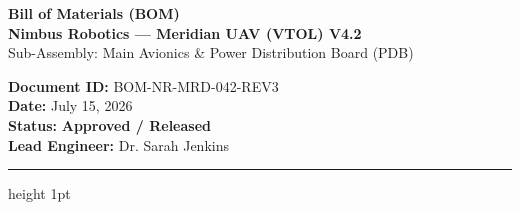 \documentclass[10pt,letterpaper]{article}
\begin{document}

\noindent
\begin{minipage}[t]{0.6\textwidth}
  {\Huge\bfseries\color{primaryColor} Bill of Materials (BOM)} \\[4pt]
  {\large\bfseries\color{secondaryColor} Nimbus Robotics --- Meridian UAV (VTOL) V4.2} \\[2pt]
  {\color{gray}\small Sub-Assembly: Main Avionics \& Power Distribution Board (PDB)}
\end{minipage}
\hfill
\begin{minipage}[t]{0.38\textwidth}
  \raggedleft
  \small
  \textbf{Document ID:} BOM-NR-MRD-042-REV3 \\
  \textbf{Date:} July 15, 2026 \\
  \textbf{Status:} \textcolor{accentColor}{\textbf{Approved / Released}} \\
  \textbf{Lead Engineer:} Dr. Sarah Jenkins
\end{minipage}
\par
\vspace{12pt}
\hrule height 1pt
\vspace{12pt}
\end{document}
